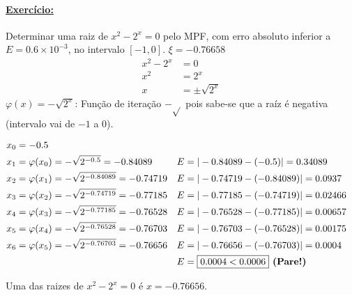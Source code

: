 \documentclass{article}
\begin{document}
        \paragraph{\underline{Exercício:}} Determinar uma raiz de $x^2 - 2^x = 0$ pelo MPF, com erro absoluto inferior a $E = 0.6 \times 10^{-3}$, no intervalo $[-1, 0]$. $\xi = -0.76658$
        \begin{align*}
            x^2 - 2^x &= 0\\
            x^2 &= 2^x\\
            x & = \pm \sqrt{2^x}
        \end{align*}
        $\varphi(x) = -\sqrt{2^x}$: Função de iteração $-\sqrt{}$ pois sabe-se que a raíz é negativa (intervalo vai de $-1$ a $0$).

        \begin{align*}
            x_0 &= -0.5\\
            x_1 &= \varphi(x_0) = -\sqrt{2^{-0.5}} = -0.84089            &       E &= |-0.84089 - (-0.5)| = 0.34089\\
            x_2 &= \varphi(x_1) = -\sqrt{2^{-0.84089}} = -0.74719        &       E &= |-0.74719 - (-0.84089)| = 0.0937\\
            x_3 &= \varphi(x_2) = -\sqrt{2^{-0.74719}} = -0.77185        &       E &= |-0.77185 - (-0.74719)| = 0.02466\\
            x_4 &= \varphi(x_3) = -\sqrt{2^{-0.77185}} = -0.76528        &       E &= |-0.76528 - (-0.77185)| = 0.00657\\
            x_5 &= \varphi(x_4) = -\sqrt{2^{-0.76528}} = -0.76703        &       E &= |-0.76703 - (-0.76528)| = 0.00175\\
            x_6 &= \varphi(x_5) = -\sqrt{2^{-0.76703}} = -0.76656        &       E &= |-0.76656 - (-0.76703)| = 0.0004\\
            &                                                            &       E &= \boxed{0.0004 < 0.0006} \text{\textbf{ (Pare!)}}\\
        \end{align*}

        Uma das raizes de $x^2 - 2^x = 0$ é $x = -0.76656$.
\end{document}
